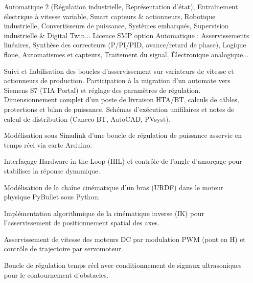 \documentclass[10pt,a4paper]{../altacv}
\begin{document}
\cvidentite
{}
\makecvheader

\cvformation
{Automatique 2 (Régulation industrielle, Représentation d’état), Entraînement électrique à vitesse variable, Smart capteurs \& actionneurs, Robotique industrielle, Convertisseurs de puissance, Systèmes embarqués, Supervision industrielle \& Digital Twin...}
{Licence SMP option Automatique : Asservissements linéaires, Synthèse des correcteurs (P/PI/PID, avance/retard de phase), Logique floue, Automatismes et capteurs, Traitement du signal, Électronique analogique...}

\expmenara
{Suivi et fiabilisation des boucles d’asservissement sur variateurs de vitesse et actionneurs de production.}
{Participation à la migration d’un automate vers Siemens S7 (TIA Portal) et réglage des paramètres de régulation.}
\vspace{2pt}
\expcore
{Dimensionnement complet d’un poste de livraison HTA/BT, calculs de câbles, protections et bilan de puissance.}
{Schémas d’exécution unifilaires et notes de calcul de distribution (Caneco BT, AutoCAD, PVsyst).}

\begin{cvitems}
  \item Modélisation sous Simulink d’une boucle de régulation de puissance asservie en temps réel via carte Arduino.
  \item Interfaçage Hardware-in-the-Loop (HIL) et contrôle de l’angle d’amorçage pour stabiliser la réponse dynamique.
\end{cvitems}
\vspace{2pt}
\begin{cvitems}
  \item Modélisation de la chaîne cinématique d’un bras (URDF) dans le moteur physique PyBullet sous Python.
  \item Implémentation algorithmique de la cinématique inverse (IK) pour l’asservissement de positionnement spatial des axes.
\end{cvitems}
\vspace{2pt}
\begin{cvitems}
  \item Asservissement de vitesse des moteurs DC par modulation PWM (pont en H) et contrôle de trajectoire par servomoteur.
  \item Boucle de régulation temps réel avec conditionnement de signaux ultrasoniques pour le contournement d’obstacles.
\end{cvitems}
\end{document}
